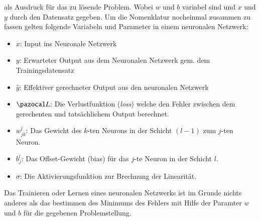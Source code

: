 als Ausdruck für das zu lösende Problem. Wobei $w$ und $b$ variabel sind und $x$ und $y$ durch den Datensatz gegeben.
Um die Nomenklatur nocheinmal zusammen zu fassen gelten folgende Variabeln und Parameter in einem neuronalen Netzwerk: 
\begin{itemize}
	\item{$x$: Input ins Neuronale Netzwerk}
	\item{$y$: Erwarteter Output aus dem Neuronalen Netzwerk gem. dem Trainingsdatensatz}
	\item{$\hat{y}$: Effektiver gerechneter Output aus den neuronalen Netzwerk}
	\item{$\Lb$: Die Verlustfunktion (\textit{loss}) welche den Fehler zwischen dem gerechenten und tatsächlichem Output berechnet.}
	\item{$w_{jk}^{l}$: Das Gewicht des $k$-ten Neurons in der Schicht $(l-1)$ zum $j$-ten Neuron.}
	\item{$b_{j}^{l}$: Das Offset-Gewicht (bias) für das $j$-te Neuron in der Schicht $l$.}
	\item{$\sigma$: Die Aktivierungsfunktion zur Brechnung der Linearität.}
\end{itemize}
Das Trainieren oder Lernen eines neuronalen Netzwerks ist im Grunde nichts anderes als das bestimmen des Minimums des Fehlers mit Hilfe der Paramter $w$ und $b$ für die gegebenen Problemstellung. 